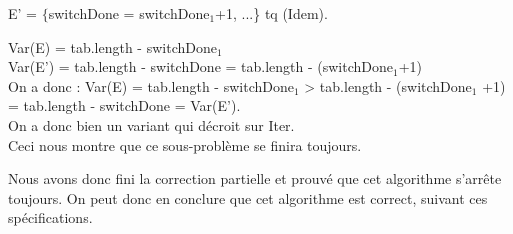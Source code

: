 E' = $\{$switchDone = switchDone$_{1}$+1, ...\} tq (Idem).\newline

\noindent Var(E) = tab.length - switchDone$_{1}$\\
Var(E') = tab.length - switchDone = tab.length - (switchDone$_{1}$+1)\\

On a donc : Var(E) = tab.length - switchDone$_{1}$ > tab.length - (switchDone$_1$ +1) = tab.length - switchDone = Var(E').\\

On a donc bien un variant qui décroit sur Iter.\\

Ceci nous montre que ce sous-problème se finira toujours. 

Nous avons donc fini la correction partielle et prouvé que cet algorithme s'arrête toujours. On peut donc en conclure que cet algorithme est correct, suivant ces spécifications. \\




